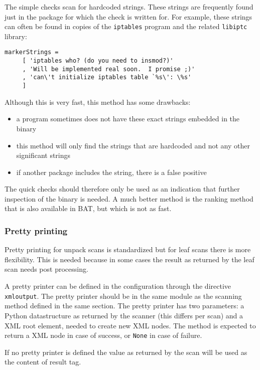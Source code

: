 \documentclass[10pt]{article}
\begin{document}
The simple checks scan for hardcoded strings. These strings are frequently
found just in the package for which the check is written for. For example,
these strings can often be found in copies of the \texttt{iptables} program and
the related \texttt{libiptc} library:

\begin{verbatim}
markerStrings =
     [ 'iptables who? (do you need to insmod?)'
     , 'Will be implemented real soon.  I promise ;)'
     , 'can\'t initialize iptables table `%s\': \%s'
     ]
\end{verbatim}

Although this is very fast, this method has some drawbacks:

\begin{itemize}
\item a program sometimes does not have these exact strings embedded in the
binary
\item this method will only find the strings that are hardcoded and not any
other significant strings
\item if another package includes the string, there is a false positive
\end{itemize}

The quick checks should therefore only be used as an indication that further
inspection of the binary is needed. A much better method is the ranking method
that is also available in BAT, but which is not as fast.

\subsubsection{Pretty printing}

Pretty printing for unpack scans is standardized but for leaf scans there is
more flexibility. This is needed because in some cases the result as returned
by the leaf scan needs post processing.

A pretty printer can be defined in the configuration through the directive
\texttt{xmloutput}. The pretty printer should be in the same module as the
scanning method defined in the same section. The pretty printer has two
parameters: a Python datastructure as returned by the scanner (this differs
per scan) and a XML root element, needed to create new XML nodes. The method is
expected to return a XML node in case of success, or \texttt{None} in case of
failure.

If no pretty printer is defined the value as returned by the scan will be used
as the content of result tag.
\end{document}
